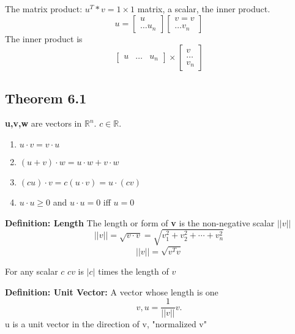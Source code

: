 The matrix product: $u^{T}*v=1\times1$ matrix, a scalar, the inner product.
\begin{equation}
	\label{}
	u=
	\begin{bmatrix}
	u\\\ldots u_{n}	
	\end{bmatrix}
	\begin{bmatrix}	
	v=v\\\ldots v_{n}
	\end{bmatrix}
\end{equation}
The inner product is
\begin{equation}
	\label{}
	\begin{bmatrix}
		u&\ldots&u_{n}	
	\end{bmatrix}\times
	\begin{bmatrix}
	v\\\ldots\\v_{n}	
	\end{bmatrix}
\end{equation}


\subsection{Theorem 6.1}
\textbf{u,v,w} are vectors in $\mathbb{R}^{n}$. $c\in\mathbb{R}$.
\begin{enumerate}
	\item $u\cdot v = v\cdot u	$
	\item $(u+v)\cdot w=u\cdot w+v\cdot w$
	\item $(cu)\cdot v=c(u\cdot v)=u\cdot(cv)$
	\item $u\cdot u\geq 0$ and $u\cdot u=0$ iff $u=0$
\end{enumerate}


\hfill
\hfill


\textbf{Definition: Length}
The length or form of \textbf{v} is the non-negative scalar $||v||$
\begin{equation}
	\label{}
	||v||=\sqrt{v\cdot v}=\sqrt{v_{1}^{2}+v_{2}^{2}+\cdots +v_{n}^{2}}	
\end{equation}
\begin{equation}
	\label{}
	||v||=\sqrt{v^{T}v}	
\end{equation}

For any scalar $c$ $cv$ is $|c|$ times the length of $v$

\hfill
\hfill


\textbf{Definition: Unit Vector:} A vector whose length is one
\begin{equation}
	\label{}
v,u=\frac{1}{||v||}v.	
\end{equation}
u is a unit vector in the direction of v, "normalized v"


